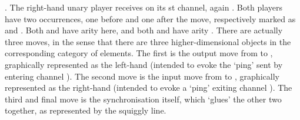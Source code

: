 \documentclass{LMCS}
\theoremstyle{plain}\newtheorem{satz}[thm]{Satz}
\begin{document}
. The right-hand unary player  receives on its st
channel, again . Both players have two occurrences, one before
and one after the move, respectively marked as  and .
Both  and  have arity  here, and both  and  have
arity . There are actually three moves, in the sense that
there are three higher-dimensional objects in the corresponding
category of elements.  The first is the output move from  to ,
graphically represented as the left-hand 
(intended to evoke the `ping' sent by  entering channel ).
The second move is the input move from  to , graphically represented
as the right-hand
 (intended to evoke a `ping' exiting channel ).  The
      third and final move is the synchronisation itself, which
      `glues' the other two together, as represented by the squiggly
      line.
\end{document}
